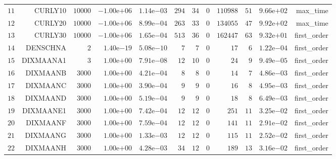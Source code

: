 \begin{longtable}{rrrrrrrrrrrr}
  \(    11\) & CURLY10 & \( 10000\) & \(-1.00\)e\(+06\) & \( 1.14\)e\(-03\) & \(   294\) & \(    34\) & \(     0\) & \(110988\) & \(    51\) & \( 9.66\)e\(+02\) & max\_time \\
  \(    12\) & CURLY20 & \( 10000\) & \(-1.00\)e\(+06\) & \( 8.99\)e\(-04\) & \(   263\) & \(    33\) & \(     0\) & \(134055\) & \(    47\) & \( 9.92\)e\(+02\) & max\_time \\
  \(    13\) & CURLY30 & \( 10000\) & \(-1.00\)e\(+06\) & \( 1.65\)e\(-04\) & \(   513\) & \(    36\) & \(     0\) & \(162447\) & \(    63\) & \( 9.32\)e\(+01\) & first\_order \\
  \(    14\) & DENSCHNA & \(     2\) & \( 1.40\)e\(-19\) & \( 5.08\)e\(-10\) & \(     7\) & \(     7\) & \(     0\) & \(    17\) & \(     6\) & \( 1.22\)e\(-04\) & first\_order \\
  \(    15\) & DIXMAANA1 & \(     3\) & \( 1.00\)e\(+00\) & \( 7.91\)e\(-08\) & \(    12\) & \(    10\) & \(     0\) & \(    24\) & \(     9\) & \( 9.49\)e\(-05\) & first\_order \\
  \(    16\) & DIXMAANB & \(  3000\) & \( 1.00\)e\(+00\) & \( 4.21\)e\(-04\) & \(     8\) & \(     8\) & \(     0\) & \(    14\) & \(     7\) & \( 4.86\)e\(-03\) & first\_order \\
  \(    17\) & DIXMAANC & \(  3000\) & \( 1.00\)e\(+00\) & \( 3.90\)e\(-04\) & \(     9\) & \(     9\) & \(     0\) & \(    16\) & \(     8\) & \( 4.95\)e\(-03\) & first\_order \\
  \(    18\) & DIXMAAND & \(  3000\) & \( 1.00\)e\(+00\) & \( 5.19\)e\(-04\) & \(     9\) & \(     9\) & \(     0\) & \(    18\) & \(     8\) & \( 6.49\)e\(-03\) & first\_order \\
  \(    19\) & DIXMAANE1 & \(  3000\) & \( 1.00\)e\(+00\) & \( 7.42\)e\(-04\) & \(    12\) & \(    12\) & \(     0\) & \(   251\) & \(    11\) & \( 3.25\)e\(-02\) & first\_order \\
  \(    20\) & DIXMAANF & \(  3000\) & \( 1.00\)e\(+00\) & \( 7.59\)e\(-04\) & \(    12\) & \(    12\) & \(     0\) & \(   141\) & \(    11\) & \( 2.91\)e\(-02\) & first\_order \\
  \(    21\) & DIXMAANG & \(  3000\) & \( 1.00\)e\(+00\) & \( 1.33\)e\(-03\) & \(    12\) & \(    12\) & \(     0\) & \(   115\) & \(    11\) & \( 2.52\)e\(-02\) & first\_order \\
  \(    22\) & DIXMAANH & \(  3000\) & \( 1.00\)e\(+00\) & \( 4.28\)e\(-03\) & \(    34\) & \(    12\) & \(     0\) & \(   189\) & \(    13\) & \( 3.16\)e\(-02\) & first\_order \\

\end{longtable}
